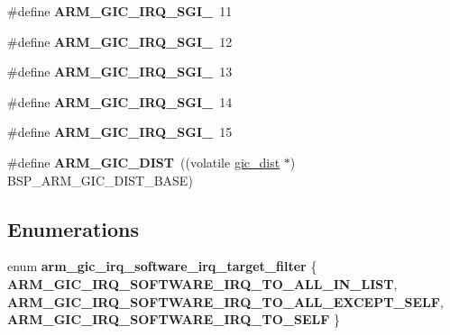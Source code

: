 \begin{DoxyCompactItemize}
\item 
\mbox{\label{arm-gic-irq_8h_af77988e09176c172efc806355b0888c5}} 
\#define {\bfseries A\+R\+M\+\_\+\+G\+I\+C\+\_\+\+I\+R\+Q\+\_\+\+S\+G\+I\+\_}~11
\item 
\mbox{\label{arm-gic-irq_8h_ad58228204772ae4186b2ce1962220b00}} 
\#define {\bfseries A\+R\+M\+\_\+\+G\+I\+C\+\_\+\+I\+R\+Q\+\_\+\+S\+G\+I\+\_}~12
\item 
\mbox{\label{arm-gic-irq_8h_a8c21dec520d58af36dcf41d0024ad440}} 
\#define {\bfseries A\+R\+M\+\_\+\+G\+I\+C\+\_\+\+I\+R\+Q\+\_\+\+S\+G\+I\+\_}~13
\item 
\mbox{\label{arm-gic-irq_8h_a938cfeed0a38cc57b1ecd4c705f2e20e}} 
\#define {\bfseries A\+R\+M\+\_\+\+G\+I\+C\+\_\+\+I\+R\+Q\+\_\+\+S\+G\+I\+\_}~14
\item 
\mbox{\label{arm-gic-irq_8h_a47ae71900f767a9aeb5f43d3d4f342d7}} 
\#define {\bfseries A\+R\+M\+\_\+\+G\+I\+C\+\_\+\+I\+R\+Q\+\_\+\+S\+G\+I\+\_}~15
\item 
\mbox{\label{arm-gic-irq_8h_aca1d7b5c601151a84a189eb7dc53bee0}} 
\#define {\bfseries A\+R\+M\+\_\+\+G\+I\+C\+\_\+\+D\+I\+ST}~((volatile \mbox{\hyperlink{structgic__dist}{gic\+\_\+dist}} $\ast$) B\+S\+P\+\_\+\+A\+R\+M\+\_\+\+G\+I\+C\+\_\+\+D\+I\+S\+T\+\_\+\+B\+A\+SE)
\end{DoxyCompactItemize}
\subsection*{Enumerations}
\begin{DoxyCompactItemize}
\item 
\mbox{\label{arm-gic-irq_8h_ac9468a80982a5f4ef8270bb69152d3c7}} 
enum {\bfseries arm\+\_\+gic\+\_\+irq\+\_\+software\+\_\+irq\+\_\+target\+\_\+filter} \{ {\bfseries A\+R\+M\+\_\+\+G\+I\+C\+\_\+\+I\+R\+Q\+\_\+\+S\+O\+F\+T\+W\+A\+R\+E\+\_\+\+I\+R\+Q\+\_\+\+T\+O\+\_\+\+A\+L\+L\+\_\+\+I\+N\+\_\+\+L\+I\+ST}, 
{\bfseries A\+R\+M\+\_\+\+G\+I\+C\+\_\+\+I\+R\+Q\+\_\+\+S\+O\+F\+T\+W\+A\+R\+E\+\_\+\+I\+R\+Q\+\_\+\+T\+O\+\_\+\+A\+L\+L\+\_\+\+E\+X\+C\+E\+P\+T\+\_\+\+S\+E\+LF}, 
{\bfseries A\+R\+M\+\_\+\+G\+I\+C\+\_\+\+I\+R\+Q\+\_\+\+S\+O\+F\+T\+W\+A\+R\+E\+\_\+\+I\+R\+Q\+\_\+\+T\+O\+\_\+\+S\+E\+LF}
 \}
\end{DoxyCompactItemize}

